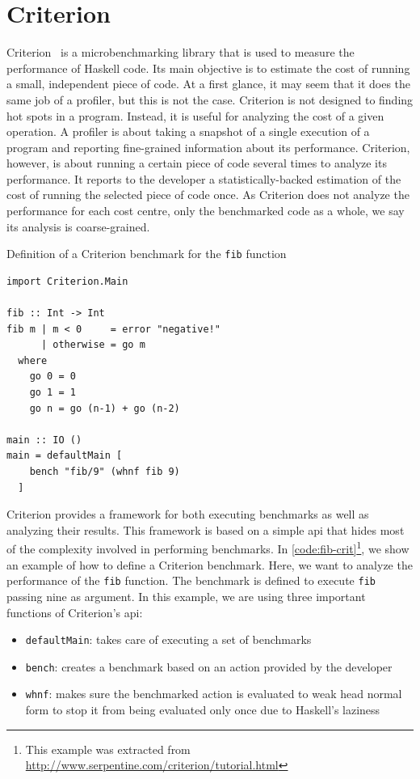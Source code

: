 \section{Criterion}\label{sec:criterion}
Criterion~\cite{sullivan:2009} is a microbenchmarking library that is used to measure the performance of Haskell code. Its main objective is to estimate the cost of running a small, independent piece of code. At a first glance, it may seem that it does the same job of a profiler, but this is not the case. Criterion is not designed to finding hot spots in a program. Instead, it is useful for analyzing the cost of a given operation. A profiler is about taking a snapshot of a single execution of a program and reporting fine-grained information about its performance. Criterion, however, is about running a certain piece of code several times to analyze its performance. It reports to the developer a statistically-backed estimation of the cost of running the selected piece of code once. As Criterion does not analyze the performance for each cost centre, only the benchmarked code as a whole, we say its analysis is coarse-grained.

\begin{listing}
  \caption{Definition of a Criterion benchmark for the \texttt{fib} function}
  \begin{verbatim}
import Criterion.Main

fib :: Int -> Int
fib m | m < 0     = error "negative!"
      | otherwise = go m
  where
    go 0 = 0
    go 1 = 1
    go n = go (n-1) + go (n-2)

main :: IO ()
main = defaultMain [
    bench "fib/9" (whnf fib 9)
  ]
  \end{verbatim}
  \label{code:fib-crit}
\end{listing}

Criterion provides a framework for both executing benchmarks as well as analyzing their results. This framework is based on a simple \ac{api} that hides most of the complexity involved in performing benchmarks. In \autoref{code:fib-crit}\footnote{This example was extracted from \url{http://www.serpentine.com/criterion/tutorial.html}}, we show an example of how to define a Criterion benchmark. Here, we want to analyze the performance of the \texttt{fib} function. The benchmark is defined to execute \texttt{fib} passing nine as argument. In this example, we are using three important functions of Criterion's \ac{api}:
\begin{itemize}
  \item \texttt{defaultMain}: takes care of executing a set of benchmarks
  \item \texttt{bench}: creates a benchmark based on an action provided by the developer
  \item \texttt{whnf}: makes sure the benchmarked action is evaluated to weak head normal form to stop it from being evaluated only once due to Haskell's laziness
\end{itemize}

